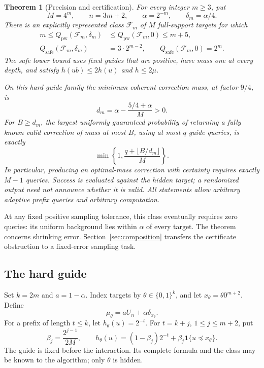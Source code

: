 \documentclass[11pt]{article}
\newtheorem{theorem}{Theorem}[section]
\theoremstyle{definition}\newtheorem{definition}[theorem]{Definition}
\theoremstyle{remark}\newtheorem{remark}[theorem]{Remark}
\newcommand{\bits}{\{0,1\}}
\newcommand{\F}{\mathcal F}
\begin{document}
\begin{theorem}[Precision and certification]\label{thm:main}
For every integer $m\ge3$, put
\[
 M=4^m,\qquad n=3m+2,\qquad \alpha=2^{-m},\qquad \delta_m=\alpha/4.
\]
There is an explicitly represented class $\F_m$ of $M$ full-support targets for which
\begin{align}
 m\le Q_{\mathrm{pw}}(\F_m,\delta_m)&\le Q_{\mathrm{pw}}(\F_m,0)\le m+5,\label{eq:point-exact}\\
 Q_{\mathrm{safe}}(\F_m,\delta_m)&=3\cdot2^{m-2},\qquad
 Q_{\mathrm{safe}}(\F_m,0)=2^m.\label{eq:safe-exact}
\end{align}
The safe lower bound uses fixed guides that are positive, have mass one at every depth, and satisfy $h(ub)\le2h(u)$ and $h\le2\mu$.

On this hard guide family the minimum coherent correction mass, at factor $9/4$, is
\begin{equation}\label{eq:dstar}
 d_m=\alpha-\frac{5/4+\alpha}{M}>0.
\end{equation}
For $B\ge d_m$, the largest uniformly guaranteed probability of returning a fully known valid correction of mass at most $B$, using at most $q$ guide queries, is exactly
\begin{equation}\label{eq:cert-tradeoff}
 \min\left\{1,\frac{q+\lfloor B/d_m\rfloor}{M}\right\}.
\end{equation}
In particular, producing an optimal-mass correction with certainty requires exactly $M-1$ queries. Success is evaluated against the hidden target; a randomized output need not announce whether it is valid. All statements allow arbitrary adaptive prefix queries and arbitrary computation.
\end{theorem}


At any fixed positive sampling tolerance, this class eventually requires zero queries: its uniform background lies within $\alpha$ of every target. The theorem concerns shrinking error. Section~\ref{sec:composition} transfers the certificate obstruction to a fixed-error sampling task.

\subsection{The hard guide}
Set $k=2m$ and $a=1-\alpha$. Index targets by $\theta\in\bits^k$, and let $x_\theta=\theta0^{m+2}$. Define
\begin{equation}\label{eq:target}
 \mu_\theta=aU_n+\alpha\delta_{x_\theta}.
\end{equation}
For a prefix of length $t\le k$, let $h_\theta(u)=2^{-t}$. For $t=k+j$, $1\le j\le m+2$, put
\begin{equation}\label{eq:guide}
 \beta_j=\frac{2^{j-1}}{2M},\qquad
 h_\theta(u)=(1-\beta_j)2^{-t}+\beta_j\mathbf1\{u\preceq x_\theta\}.
\end{equation}
The guide is fixed before the interaction. Its complete formula and the class may be known to the algorithm; only $\theta$ is hidden.
\end{document}
